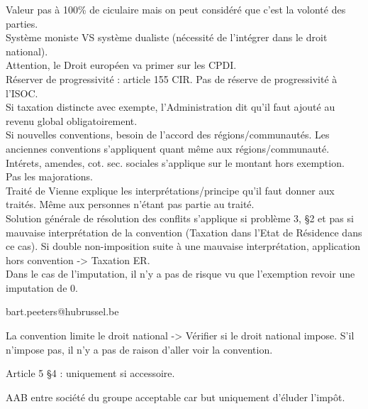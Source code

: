 \documentclass{book}
\begin{document}
Valeur pas à 100\% de ciculaire mais on peut considéré que c'est la volonté des parties.\\

Système moniste VS système dualiste (nécessité de l'intégrer dans le droit national).\\

Attention, le Droit européen va primer sur les CPDI.\\

Réserver de progressivité : article 155 CIR. Pas de réserve de progressivité à l'ISOC.\\

Si taxation distincte avec exempte, l'Administration dit qu'il faut ajouté au revenu global obligatoirement.\\

Si nouvelles conventions, besoin de l'accord des régions/communautés. Les anciennes conventions s'appliquent quant même aux régions/communauté.\\

Intérets, amendes, cot. sec. sociales s'applique sur le montant hors exemption. Pas les majorations.\\

Traité de Vienne explique les interprétations/principe qu'il faut donner aux traités. Même aux personnes n'étant pas partie au traité.\\

Solution générale de résolution des conflits s'applique si problème 3, §2 et pas si mauvaise interprétation de la convention (Taxation dans l'Etat de Résidence dans ce cas). Si double non-imposition suite à une mauvaise interprétation, application hors convention -> Taxation ER.\\

Dans le cas de l'imputation, il n'y a pas de risque vu que l'exemption revoir une imputation de 0.




bart.peeters@hubrussel.be

La convention limite le droit national -> Vérifier si le droit national impose. S'il n'impose pas, il n'y a pas de raison d'aller voir la convention.

Article 5 §4 : uniquement si accessoire.

AAB entre société du groupe acceptable car but uniquement d'éluder l'impôt.


\nocite{*}

\end{document}
